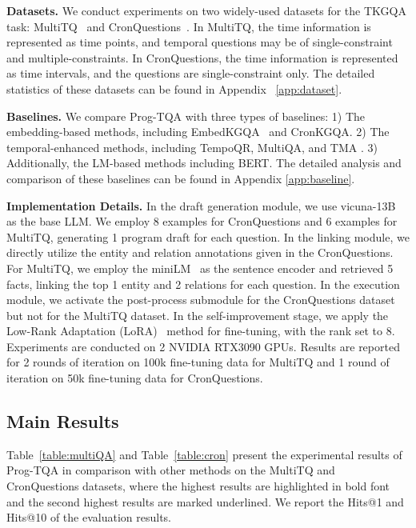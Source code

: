 \documentclass[10pt, a4paper]{article}
\begin{document}
\textbf{Datasets.} 
We conduct experiments on two widely-used datasets for the TKGQA task: MultiTQ~\cite{chen2023multi} and CronQuestions~\cite{saxena2021question}. In MultiTQ, the time information is represented as time points, and temporal questions may be of single-constraint and multiple-constraints. In CronQuestions, the time information is represented as time intervals, and the questions are single-constraint only. The detailed statistics of these datasets can be found in Appendix ~\ref{app:dataset}.


\textbf{Baselines.}
We compare Prog-TQA with three types of baselines: 1) The embedding-based methods, including EmbedKGQA~\cite{saxena2020improving} and CronKGQA\cite{saxena2021question}. 2) The temporal-enhanced methods, including TempoQR\cite{mavromatis2022tempoqr}, MultiQA\cite{chen2023multi}, and TMA \cite{liu2023time}. 3) Additionally, the LM-based methods including BERT\cite{kenton2019bert}. The detailed analysis and comparison of these baselines can be found in Appendix \ref{app:baseline}.

\textbf{Implementation Details.}
In the draft generation module, we use vicuna-13B~\cite{vicuna2023} as the base LLM. We employ 8 examples for CronQuestions and 6 examples for MultiTQ, generating 1 program draft for each question. In the linking module, we directly utilize the entity and relation annotations given in the CronQuestions. For MultiTQ, we employ the miniLM~\cite{wang2020minilm} as the sentence encoder and retrieved 5 facts, linking the top 1 entity and 2 relations for each question. In the execution module, we activate the post-process submodule for the CronQuestions dataset but not for the MultiTQ dataset. In the self-improvement stage, we apply the Low-Rank Adaptation (LoRA)~\cite{hu2021lora} method for fine-tuning, with the rank set to 8. Experiments are conducted on 2 NVIDIA RTX3090 GPUs. Results are reported for 2 rounds of iteration on 100k fine-tuning data for MultiTQ and 1 round of iteration on 50k fine-tuning data for CronQuestions.
\subsection{Main Results}
Table~\ref{table:multiQA} and Table~\ref{table:cron} present the experimental results of Prog-TQA in comparison with other methods on the MultiTQ and CronQuestions datasets, where the highest results are highlighted in bold font and the second highest results are marked underlined. We report the Hits@1 and Hits@10 of the evaluation results.
\end{document}
